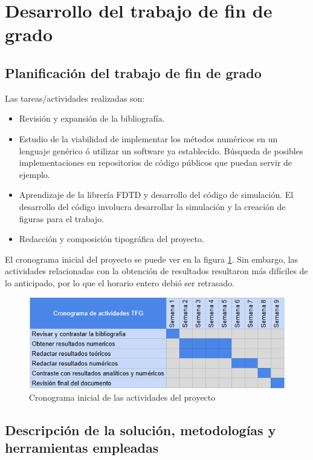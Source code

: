 \section{Desarrollo del trabajo de fin de grado}

\subsection{Planificación del trabajo de fin de grado}

Las tareas/actividades realizadas son:

\begin{itemize}
    \item  Revisión y expansión de la bibliografía.
    \item Estudio de la viabilidad de implementar los métodos numéricos en un lenguaje genérico ó utilizar un software ya establecido. Búsqueda de posibles implementaciones en repositorios de código públicos que puedan servir de ejemplo.
    \item Aprendizaje de la librería FDTD y desarrollo del código de simulación. El desarrollo del código involucra desarrollar la simulación y la creación de figuras para el trabajo.
    \item Redacción y composición tipográfica del proyecto.
\end{itemize}

El cronograma inicial del proyecto se puede ver en la figura \ref{fig:cronograma}. Sin embargo, las actividades relacionadas con la obtención de resultados resultaron más difíciles de lo anticipado, por lo que el horario entero debió ser retrasado. 

\begin{figure}[h]
    \centering
    \includegraphics[width=0.65\linewidth]{figures/Cronograma1.png}
    \caption{Cronograma inicial de las actividades del proyecto}
    \label{fig:cronograma}
\end{figure}

\subsection{Descripción de la solución, metodologías y herramientas empleadas}

